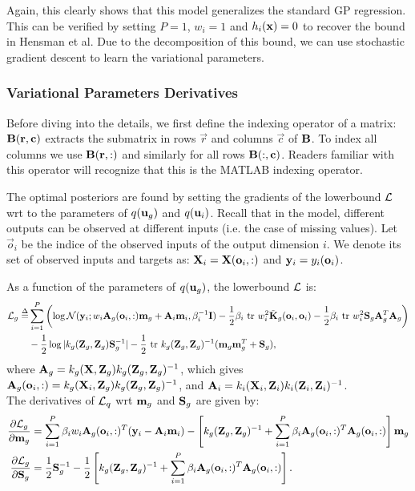 \documentclass{article} %
\begin{document}
\noindent Again, this clearly shows that this model generalizes the standard GP regression. This can be verified by setting $P = 1$, $w_i = 1$ and $h_i(\x) = 0$ to recover the bound in Hensman et al.
Due to the decomposition of this bound, we can use stochastic gradient descent to learn the variational parameters.

\subsubsection{Variational Parameters Derivatives}
\newcommand{\oi}{\vec{o}_i}
Before diving into the details, we first define the indexing operator of a matrix: $\B(\vec{r},\vec{c})$ extracts the submatrix in rows $\vec{r}$ and columns $\vec{c}$ of $\B$.
To index all columns we use $\B(\vec{r},:)$ and similarly for all rows $\B(:,\vec{c})$.
Readers familiar with this operator will recognize that this is the MATLAB indexing operator.

The optimal posteriors are found by setting the gradients of the lowerbound $\calL$ wrt to the parameters of $q(\ug)$ and $q(\u_i)$.
Recall that in the model, different outputs can be observed at different inputs (i.e. the case of missing values).
Let $\oi$ be the indice of the observed inputs of the output dimension $i$.
We denote its set of observed inputs and targets as: $\X_i = \X(\oi,:)$ and $\y_i = y_{i}(\oi)$.

\noindent As a function of the parameters of $q(\ug)$, the lowerbound $\calL$ is:
\begin{align}
\nonumber
\calL_g \define&
 \sum_{i=1}^P \left( \log \Normal(\y_i; w_i \A_g(\oi,:) \m_g + \A_i \m_i, \beta_i^{-1} \I)
 - \frac{1}{2} \beta_i \trace w_i^2 \tilde{\K}_g(\oi,\oi)
 - \frac{1}{2} \beta_i \trace w_i^2 \S_g \A_g^T \A_g 
  \right) \\
  &- \frac{1}{2} \log |k_g(\Zg,\Zg) \S_g^{-1}| -\frac{1}{2} \trace k_g(\Zg,\Zg)^{-1} (\m_g \m_g^T + \S_g) ,
\end{align}
where $\A_g = k_g(\X,\Z_g)k_g(\Z_g,\Z_g)^{-1}$, which gives $\A_g(\oi,:) = k_g(\X_i,\Zg) k_g(\Z_g,\Z_g)^{-1}$, and  
$\A_i = k_i(\X_i,\Z_i)k_i(\Z_i,\Z_i)^{-1}$. \\

\noindent The derivatives of $\calL_q$ wrt $\m_g$ and $\S_g$ are given by:
\begin{align}
\deriv{\calL_g}{\m_g}
& = \sum_{i=1}^P \beta_i w_i \A_g(\oi,:)^T (\y_i - \A_i \m_i) - \left[k_g(\Zg,\Zg)^{-1} + \sum_{i=1}^P \beta_i \A_g(\oi,:)^T \A_g(\oi,:) \right] \m_g \\
\deriv{\calL_g}{\S_g} 
&= \frac{1}{2} \S_g^{-1} - \frac{1}{2} \left[ k_g(\Zg,\Zg)^{-1} + \sum_{i=1}^P \beta_i \A_g(\oi,:)^T \A_g(\oi,:) \right].
\end{align}
\end{document}
